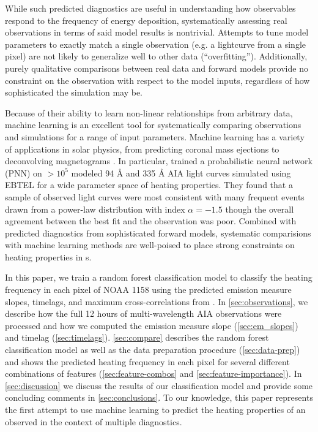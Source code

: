 While such predicted diagnostics are useful in understanding how observables respond to the frequency of energy deposition, systematically assessing real observations in terms of said model results is nontrivial. Attempts to tune model parameters to exactly match a single observation (e.g. a lightcurve from a single pixel) are not likely to generalize well to other data (``overfitting''). Additionally, purely qualitative comparisons between real data and forward models provide no constraint on the observation with respect to the model inputs, regardless of how sophisticated the simulation may be.

Because of their ability to learn non-linear relationships from arbitrary data, machine learning  is an excellent tool for systematically comparing observations and simulations for a range of input parameters. Machine learning has a variety of applications in solar physics, from predicting coronal mass ejections \citep[e.g.][]{bobra_predicting_2016} to deconvolving magnetograms \citep{baso_enhancing_2018}. In particular, \citet{tajfirouze_time-resolved_2016} trained a probabilistic neural network (PNN) on  $>10^5$ modeled 94 \AA{} and 335 \AA{} AIA light curves simulated using EBTEL for a wide parameter space of heating properties. They found that a sample of observed light curves were most consistent with many frequent events drawn from a power-law distribution with index $\alpha=-1.5$ though the overall agreement between the best fit and the observation was poor. Combined with predicted diagnostics from sophisticated forward models, systematic comparisions with machine learning methods are well-poised to place strong constraints on heating properties in \AR s.

In this paper, we train a random forest classification model to classify the heating frequency in each pixel of \AR{} NOAA 1158 using the predicted emission measure slopes, timelags, and maximum cross-correlations from . In \autoref{sec:observations}, we describe how the full 12 hours of multi-wavelength AIA observations were processed and how we computed the emission measure slope (\autoref{sec:em_slopes}) and timelag (\autoref{sec:timelags}). \autoref{sec:compare} describes the random forest classification model as well as the data preparation procedure (\autoref{sec:data-prep}) and shows the predicted heating frequency in each pixel for several different combinations of features (\autoref{sec:feature-combos} and \ref{sec:feature-importance}). In \autoref{sec:discussion} we discuss the results of our classification model and provide some concluding comments in \autoref{sec:conclusions}. To our knowledge, this paper represents the first attempt to use machine learning to predict the heating properties of an observed \AR{} in the context of multiple diagnostics.
